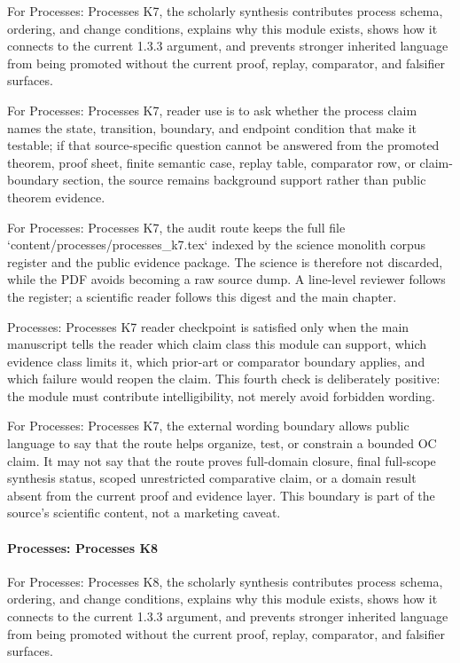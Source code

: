 For Processes: Processes K7, the scholarly synthesis contributes process schema, ordering, and change conditions, explains why this module exists, shows how it connects to the current 1.3.3 argument, and prevents stronger inherited language from being promoted without the current proof, replay, comparator, and falsifier surfaces.


For Processes: Processes K7, reader use is to ask whether the process claim names the state, transition, boundary, and endpoint condition that make it testable; if that source-specific question cannot be answered from the promoted theorem, proof sheet, finite semantic case, replay table, comparator row, or claim-boundary section, the source remains background support rather than public theorem evidence.


For Processes: Processes K7, the audit route keeps the full file `content/processes/processes\_k7.tex` indexed by the science monolith corpus register and the public evidence package. The science is therefore not discarded, while the PDF avoids becoming a raw source dump. A line-level reviewer follows the register; a scientific reader follows this digest and the main chapter.


Processes: Processes K7 reader checkpoint is satisfied only when the main manuscript tells the reader which claim class this module can support, which evidence class limits it, which prior-art or comparator boundary applies, and which failure would reopen the claim. This fourth check is deliberately positive: the module must contribute intelligibility, not merely avoid forbidden wording.


For Processes: Processes K7, the external wording boundary allows public language to say that the route helps organize, test, or constrain a bounded OC claim. It may not say that the route proves full-domain closure, final full-scope synthesis status, scoped unrestricted comparative claim, or a domain result absent from the current proof and evidence layer. This boundary is part of the source's scientific content, not a marketing caveat.


\paragraph{Processes: Processes K8}

For Processes: Processes K8, the scholarly synthesis contributes process schema, ordering, and change conditions, explains why this module exists, shows how it connects to the current 1.3.3 argument, and prevents stronger inherited language from being promoted without the current proof, replay, comparator, and falsifier surfaces.


